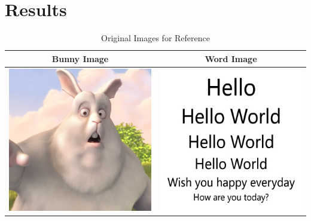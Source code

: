 \newpage
\section{Results} 

\begin{table}[h!]
  \centering
    \caption{Original Images for Reference}
    \begin{tabular}{| c | c |}
    \hline Bunny Image & Word Image \\ \hline
      \includegraphics[width=2.5in]{chapters/chapter5/images/Clean_Images/0084_820.png} &
      \includegraphics[width=2.5in]{chapters/chapter5/images/Clean_Images/Hello.png} \\ \hline
    \end{tabular}
\end{table}


